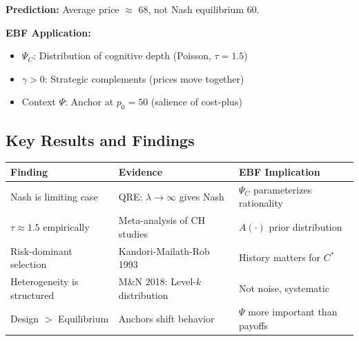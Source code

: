 \begin{tcolorbox}[colback=orange!5!white, colframe=orange!75!black,
    title=\textbf{Worked Example: Bertrand Competition with Bounded Rationality}]
\textbf{Prediction:} Average price $\approx$ 68, not Nash equilibrium 60.

\textbf{EBF Application:}
\begin{itemize}[nosep]
    \item $\Psi_C$: Distribution of cognitive depth (Poisson, $\tau = 1.5$)
    \item $\gamma > 0$: Strategic complements (prices move together)
    \item Context $\Psi$: Anchor at $p_0 = 50$ (salience of cost-plus)
\end{itemize}

\end{tcolorbox}

\subsection{Key Results and Findings}
\label{sec:ad-results}


\begin{center}
\renewcommand{\arraystretch}{1.3}
\begin{tabular}{@{}p{4.5cm}p{5cm}p{4cm}@{}}
\toprule
\textbf{Finding} & \textbf{Evidence} & \textbf{EBF Implication} \\
\midrule
Nash is limiting case & QRE: $\lambda \to \infty$ gives Nash & $\Psi_C$ parameterizes rationality \\
$\tau \approx 1.5$ empirically & Meta-analysis of CH studies & $A(\cdot)$ prior distribution \\
Risk-dominant selection & Kandori-Mailath-Rob 1993 & History matters for $C^*$ \\
Heterogeneity is structured & M\&N 2018: Level-$k$ distribution & Not noise, systematic \\
Design $>$ Equilibrium & Anchors shift behavior & $\Psi$ more important than payoffs \\
\bottomrule
\end{tabular}
\end{center}


